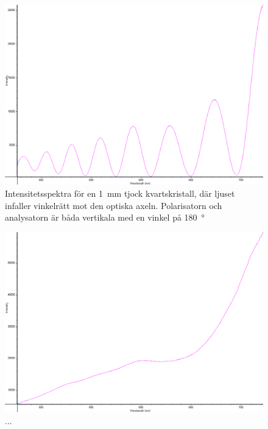 \documentclass[a4paper]{article}
\begin{document}
\FloatBarrier
\begin{figure}[h!]
	\centering
	\includegraphics[width=\linewidth]{data/spektra_180_kristall2_0_inv}
	\caption{Intensitetsspektra för en \SI{1}{\milli\m} tjock kvartskristall, där ljuset infaller vinkelrätt mot den optiska axeln.  Polarisatorn och analysatorn är båda vertikala med en vinkel på \SI{180}{\degree}}
	\label{fig:}
\end{figure}
\FloatBarrier	

\FloatBarrier
\begin{figure}[h!]
	\centering
	\includegraphics[width=\linewidth]{data/spektra_180_kristall2_70_inv}
	\caption{...}
	\label{fig:}
\end{figure}
\FloatBarrier
\end{document}
